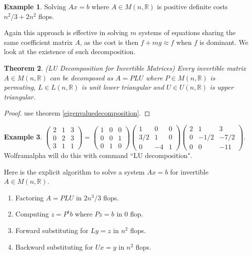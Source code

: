 \documentclass[12pt]{amsart}
\newtheorem{theorem}{Theorem}[section]
\theoremstyle{definition}
\newtheorem{example}[theorem]{Example}
\begin{document}
\begin{example} Solving $Ax = b$ where $A \in M(n, \mathbb{R})$ is positive definite costs $n^2/3 + 2n^2$ flops.
\end{example}

Again this approach is effective in solving $m$ systems of equations sharing the same coefficient matrix $A$, as the cost is then $f + mg \approx f$ when $f$ is dominant. We look at the existence of such decomposition.

\begin{theorem}\label{LUdecomposition} (LU Decomposition for Invertible Matrices) Every invertible matrix $A \in M(n, \mathbb{R})$ can be decomposed as $A = PLU$ where $P \in M(n, \mathbb{R})$ is permuting, $L \in L(n, \mathbb{R})$ is unit lower triangular and $U \in U(n, \mathbb{R})$ is upper triangular.
\end{theorem}
\begin{proof} use theorem \ref{eigenvaluedecomposition}.
\end{proof}

\begin{example}\label{LUdecompositionexample1} $\left(\begin{array}{ccc} 2 & 1 & 3\\ 0 & 2 & 3 \\ 3 & 1 & 1 \end{array}\right) = \left(\begin{array}{ccc} 1 & 0 & 0\\ 0 & 0 & 1\\ 0 & 1 & 0 \end{array}\right)\left(\begin{array}{ccc} 1 & 0 & 0 \\ 3/2 & 1 & 0 \\ 0 & -4 & 1 \end{array}\right)\left(\begin{array}{ccc} 2 & 1 & 3 \\ 0 & -1/2 & -7/2 \\ 0 & 0 & -11 \end{array}\right)$. Wolframalpha will do this with command ``LU decomposition".
\end{example}

Here is the explicit algorithm to solve a system $Ax = b$ for invertible $A \in M(n, \mathbb{R})$.
\begin{enumerate}[\indent 1.]
\item Factoring $A = PLU$ in $2n^3/3$ flops.
\item Computing $z = P^tb$ where $Pz = b$ in 0 flop.
\item Forward substituting for $Ly = z$ in $n^2$ flops.
\item Backward substituting for $Ux = y$ in $n^2$ flops.
\end{enumerate}
\end{document}
